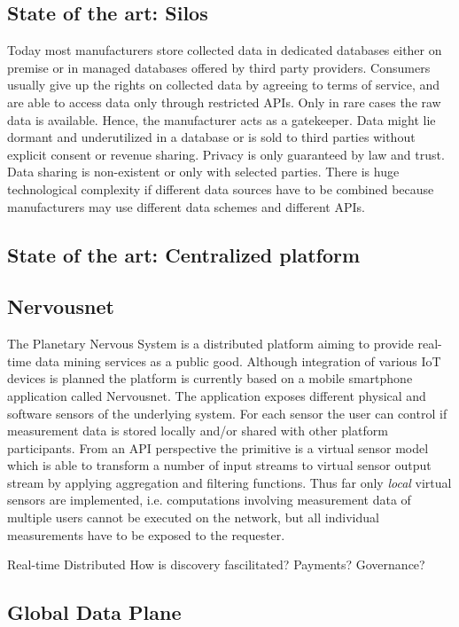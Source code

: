 \documentclass[journal]{IEEEtran}
\begin{document}
\subsection{State of the art: Silos}

Today most manufacturers store collected data in dedicated databases either on premise or in managed databases offered by third party providers. Consumers usually give up the rights on collected data by agreeing to terms of service, and are able to access data only through  restricted APIs. Only in rare cases the raw data is available. Hence, the manufacturer acts as a gatekeeper. Data might lie dormant and underutilized in a database or is sold to third parties without explicit consent or revenue sharing. Privacy is only guaranteed by law and trust. Data sharing is non-existent or only with selected parties. There is huge technological complexity if different data sources have to be combined because manufacturers may use different data schemes and different APIs. 

\subsection{State of the art: Centralized platform}


\subsection{Nervousnet}

The Planetary Nervous System is a distributed platform aiming to provide real-time data mining services as a public good. Although integration of various IoT devices is planned the platform is currently based on a mobile smartphone application called Nervousnet. The application exposes different physical and software sensors of the underlying system. For each sensor the user can control if measurement data is stored locally and/or shared with other platform participants. From an API perspective the primitive is a virtual sensor model which is able to transform a number of input streams to virtual sensor output stream by applying aggregation and filtering functions. Thus far only \emph{local} virtual sensors are implemented, i.e. computations involving measurement data of multiple users cannot be executed on the network, but all individual measurements have to be exposed to the requester. 

Real-time
Distributed
How is discovery fascilitated? Payments? Governance?


\subsection{Global Data Plane}
\end{document}
